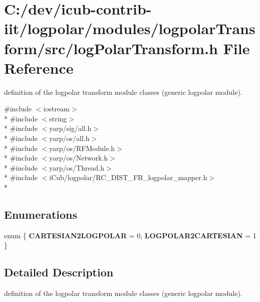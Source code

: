 \section{C\+:/dev/icub-\/contrib-\/iit/logpolar/modules/logpolar\+Transform/src/log\+Polar\+Transform.h File Reference}
\label{logPolarTransform_8h}


definition of the logpolar transform module classes (generic logpolar module).  


{\ttfamily \#include $<$iostream$>$}\\*
{\ttfamily \#include $<$string$>$}\\*
{\ttfamily \#include $<$yarp/sig/all.\+h$>$}\\*
{\ttfamily \#include $<$yarp/os/all.\+h$>$}\\*
{\ttfamily \#include $<$yarp/os/\+R\+F\+Module.\+h$>$}\\*
{\ttfamily \#include $<$yarp/os/\+Network.\+h$>$}\\*
{\ttfamily \#include $<$yarp/os/\+Thread.\+h$>$}\\*
{\ttfamily \#include $<$i\+Cub/logpolar/\+R\+C\+\_\+\+D\+I\+S\+T\+\_\+\+F\+B\+\_\+logpolar\+\_\+mapper.\+h$>$}\\*
\subsection*{Enumerations}
\begin{DoxyCompactItemize}
\item 
enum \{ {\bfseries C\+A\+R\+T\+E\+S\+I\+A\+N2\+L\+O\+G\+P\+O\+L\+A\+R} = 0, 
{\bfseries L\+O\+G\+P\+O\+L\+A\+R2\+C\+A\+R\+T\+E\+S\+I\+A\+N} = 1
 \}\label{logPolarTransform_8h_a99fb83031ce9923c84392b4e92f956b5}

\end{DoxyCompactItemize}


\subsection{Detailed Description}
definition of the logpolar transform module classes (generic logpolar module). 

